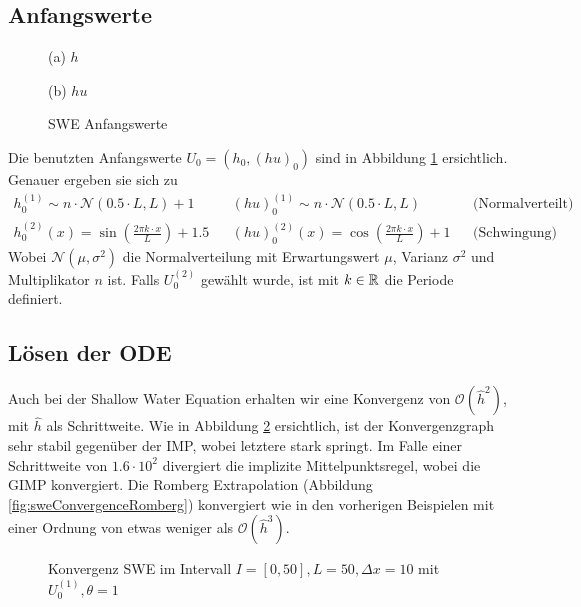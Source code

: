 \subsection{Anfangswerte}
\begin{figure}[H]
\footnotesize
\centering
\begin{minipage}[b]{0.49\linewidth}

\caption*{(a) $h$}
\end{minipage}
\begin{minipage}[b]{0.49\linewidth}

\caption*{(b) $hu$}
\end{minipage}
\caption{SWE Anfangswerte}
\label{fig:sweInitialValues}
\end{figure}
Die benutzten Anfangswerte $U_0 = (h_0,(hu)_0)$ sind in Abbildung \ref{fig:sweInitialValues} ersichtlich. Genauer ergeben sie sich zu
\[
\begin{aligned}
 h_0^{(1)} \sim n\cdot\mathcal N(0.5\cdot L,L) + 1 &&(hu)_0^{(1)}\sim n\cdot\mathcal N(0.5\cdot L,L) && \text{(Normalverteilt)}\\
 h_0^{(2)}(x)= \sin\left( \frac{2\pi k\cdot x}{L}\right) + 1.5 &&(hu)_0^{(2)}(x) = \cos\left( \frac{2\pi k\cdot x}{L}\right) + 1  && \text{(Schwingung)}
\end{aligned}
\]
Wobei $\mathcal N(\mu, \sigma^2)$ die Normalverteilung mit Erwartungswert $\mu$, Varianz $\sigma^2$ und Multiplikator $n$ ist. Falls $U_0^{(2)}$ gewählt wurde, ist mit $k\in \mathbb{R}$ die Periode definiert. 
\subsection{Lösen der ODE}
Auch bei der Shallow Water Equation erhalten wir eine Konvergenz von $\mathcal O(\hat h^2)$, mit $\hat h$ als Schrittweite. Wie in Abbildung \ref{fig:sweConvergence} ersichtlich, ist der Konvergenzgraph sehr stabil gegenüber der IMP, wobei letztere stark springt.
Im Falle einer Schrittweite von $1.6\cdot 10^2$ divergiert die implizite Mittelpunktsregel, wobei die GIMP konvergiert. 
Die Romberg Extrapolation (Abbildung \ref{fig:sweConvergenceRomberg}) konvergiert wie in den vorherigen Beispielen mit einer Ordnung von etwas weniger als $\mathcal O(\hat h^3)$. 

\begin{figure}
\centering

\caption{Konvergenz SWE im Intervall $I = [0,50], L=50, \Delta x=10$ mit $U_0^{(1)},\theta=1$}
\label{fig:sweConvergence}
\end{figure}


